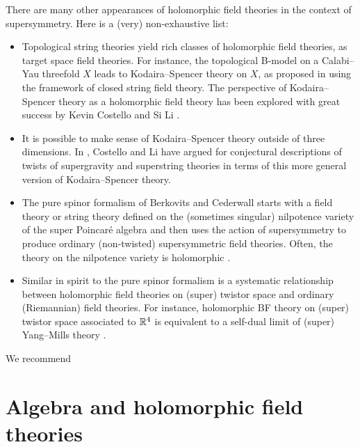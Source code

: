 \documentclass[11pt]{amsart}
\begin{document}
There are many other appearances of holomorphic field theories in the context of supersymmetry.
Here is a (very) non-exhaustive list:
\begin{itemize}
\item Topological string theories yield rich classes of holomorphic field theories, as target space field theories. 
For instance, the topological B-model on a Calabi--Yau threefold $X$ leads to Kodaira--Spencer theory on $X$, as proposed in \cite{BCOV} using the framework of closed string field theory. 
The perspective of Kodaira--Spencer theory as a holomorphic field theory has been explored with great success by Kevin Costello and Si Li \cite{CL1, CL2, CL3}.
\item
It is possible to make sense of Kodaira--Spencer theory outside of three dimensions.
In \cite{CLsugra}, Costello and Li have argued for conjectural descriptions of twists of supergravity and superstring theories in terms of this more general version of Kodaira--Spencer theory.
\item The pure spinor formalism of Berkovits and Cederwall  \cite{Cederwall, Berkovits} starts with a field theory or string theory defined on the (sometimes singular) nilpotence variety of the super Poincar\'e algebra and then uses the action of supersymmetry to produce ordinary (non-twisted) supersymmetric field theories. 
Often, the theory on the nilpotence variety is holomorphic \cite{ESW,SWpure}. 
\item Similar in spirit to the pure spinor formalism is a systematic relationship between holomorphic field theories on (super) twistor space and ordinary (Riemannian) field theories.
For instance, holomorphic BF theory on (super) twistor space associated to $\mathbb R^4$ is equivalent to a self-dual limit of (super) Yang--Mills theory \cite{Penrose, Kevins work..., other twistor literature}.
\end{itemize}
We recommend 

\section{Algebra and holomorphic field theories}
\label{sec: algebra}
\end{document}
